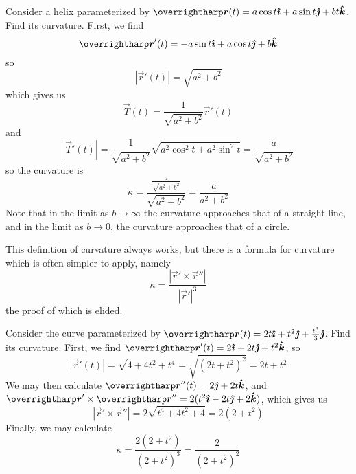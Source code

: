 \documentclass[../main.tex]{subfiles}
\begin{document}
        \begin{example}{}{}
                Consider a helix parameterized by \(\vec{r}(t)=a\cos{t}\i+a\sin{t}\j+bt\k\). Find its curvature.
                \tcblower
                First, we find
                \[
                \vec{r}'(t)=-a\sin{t}\i+a\cos{t}\j+b\k
                \]
                so
                \[
                |\vec{r}'(t)|=\sqrt{a^2+b^2}
                \]
                which gives us
                \[
                \vec{T}(t)=\frac{1}{\sqrt{a^2+b^2}}\vec{r}'(t)
                \]
                and
                \[
                |\vec{T}'(t)|=\frac{1}{\sqrt{a^2+b^2}}\sqrt{a^2\cos^2{t}+a^2\sin^2{t}} = \frac{a}{\sqrt{a^2+b^2}}
                \]
                so the curvature is
                \[
                \kappa = \frac{\frac{a}{\sqrt{a^2+b^2}}}{\sqrt{a^2+b^2}} = \frac{a}{a^2+b^2}
                \]
                Note that in the limit as \(b\to\infty\) the curvature approaches that of a straight line, and in the limit as \(b\to 0\), the curvature approaches that of a circle.
        \end{example}{}{}
        This definition of curvature always works, but there is a formula for curvature which is often simpler to apply, namely
        \[
        \kappa = \frac{|\vec{r}'\times\vec{r}''|}{|\vec{r}'|^3}
        \]
        the proof of which is elided.
        \begin{example}{}{}
                Consider the curve parameterized by \(\vec{r}(t)=2t\i+t^2\j+\frac{t^3}{3}\j\). Find its curvature.
                \tcblower
                First, we find \(\vec{r}'(t)=2\i+2t\j+t^2\k\), so
                \[
                |\vec{r}'(t)|=\sqrt{4+4t^2+t^4}=\sqrt{(2t+t^2)^2}=2t+t^2
                \]
                We may then calculate \(\vec{r}''(t)=2\j+2t\k\), and \(\vec{r}'\times\vec{r}''=2(t^2\i-2t\j+2\k)\), which gives us
                \[
                |\vec{r}'\times\vec{r}''|=2\sqrt{t^4+4t^2+4}=2(2+t^2)
                \]
                Finally, we may calculate
                \[
                \kappa = \frac{2(2+t^2)}{(2+t^2)^3} = \frac{2}{(2+t^2)^2}
                \]
        \end{example}
\end{document}
